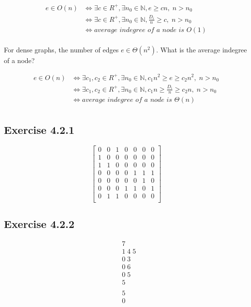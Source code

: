 \documentclass{article}
\begin{document}
\begin{align*}
e \in O(n) & \iff \exists c\in R^+, \exists n_0 \in \mathbb{N}, e \geq cn,\; n>n_0 \\
& \iff \exists c\in R^+, \exists n_0 \in \mathbb{N}, \frac{D_i}{n} \geq c,\; n>n_0 \\
& \iff \textit{average indegree of a node is } O(1) \\
\end{align*}

For dense graphs, the number of edges \(e \in \Theta(n^2)\). What is the average indegree of a node?

\begin{align*}
e \in O(n) & \iff \exists c_1,c_2\in R^+, \exists n_0 \in \mathbb{N}, c_1n^2 \geq e \geq c_2n^2,\; n>n_0 \\
& \iff \exists c_1,c_2\in R^+, \exists n_0 \in \mathbb{N}, c_1n \geq \frac{D_i}{n} \geq c_2n,\; n>n_0 \\
& \iff \textit{average indegree of a node is } \Theta(n) \\
\end{align*}


\subsection*{Exercise 4.2.1}

\[\left[
	\begin{array}{ccccccc}
	0& 0& 1& 0& 0& 0& 0 \\
	1& 0& 0& 0& 0& 0& 0 \\
	1& 1& 0& 0& 0& 0& 0 \\
	0& 0& 0& 0& 1& 1& 1 \\
	0& 0& 0& 0& 0& 1& 0 \\
	0& 0& 0& 1& 1& 0& 1 \\
	0& 1& 1& 0& 0& 0& 0 \\
	\end{array}
\right]\]


\subsection*{Exercise 4.2.2}

\begin{align*}
&7 \\
&1\; 4\; 5 \\
&0\; 3 \\
&0\; 6 \\
&0\; 5 \\
&5 \\
&\\
&5\\
&0 \\
\end{align*}
\end{document}
